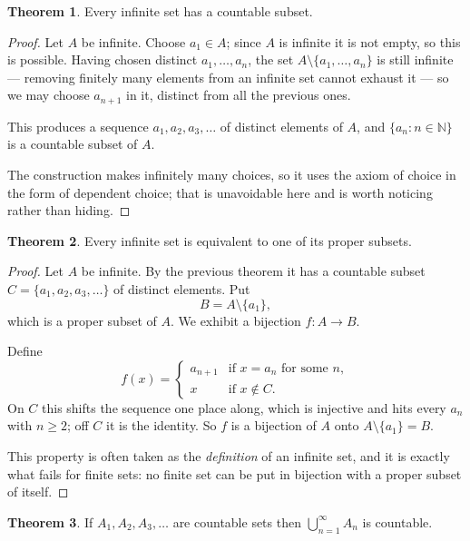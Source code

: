 \documentclass[11pt,a4paper]{article}
\theoremstyle{definition}
\newtheorem{thm}{Theorem}[section]
\begin{document}
\begin{thm}
Every infinite set has a countable subset.

\end{thm}

\begin{proof}
Let $A$ be infinite. Choose $a_1\in A$; since $A$ is infinite it is not empty,
so this is possible. Having chosen distinct $a_1,\dots,a_n$, the set
$A\setminus\{a_1,\dots,a_n\}$ is still infinite --- removing finitely many
elements from an infinite set cannot exhaust it --- so we may choose
$a_{n+1}$ in it, distinct from all the previous ones.

This produces a sequence $a_1,a_2,a_3,\dots$ of distinct elements of $A$, and
$\{a_n:n\in\mathbb{N}\}$ is a countable subset of $A$.

The construction makes infinitely many choices, so it uses the axiom of choice
in the form of dependent choice; that is unavoidable here and is worth noticing
rather than hiding.
\end{proof}


\begin{thm}
Every infinite set is equivalent to one of its proper subsets.

\end{thm}

\begin{proof}
Let $A$ be infinite. By the previous theorem it has a countable subset
$C=\{a_1,a_2,a_3,\dots\}$ of distinct elements. Put
$$B=A\setminus\{a_1\},$$
which is a proper subset of $A$. We exhibit a bijection $f:A\rightarrow B$.

Define
$$f(x)=\begin{cases}
a_{n+1} & \text{if } x=a_n \text{ for some } n,\\
x & \text{if } x\notin C .
\end{cases}$$
On $C$ this shifts the sequence one place along, which is injective and hits
every $a_n$ with $n\geq 2$; off $C$ it is the identity. So $f$ is a bijection
of $A$ onto $A\setminus\{a_1\}=B$.

This property is often taken as the \emph{definition} of an infinite set, and
it is exactly what fails for finite sets: no finite set can be put in bijection
with a proper subset of itself.
\end{proof}


\begin{thm}
If $A_1,A_2,A_3,\dots$ are countable sets then $\bigcup\limits^{\infty}_{n=1}A_n$ is countable.

\end{thm}
\end{document}
